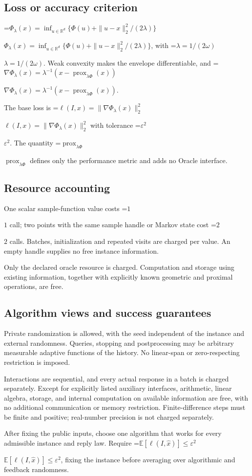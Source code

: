 \documentclass[10pt,a4paper]{article}
\newcommand{\AtlasMath}[1]{\par\begingroup\centering\setbox0=\hbox{$\displaystyle #1$}\ifdim\wd0>1.4\linewidth\typeout{ATLAS WIDE FORMULA: \the\wd0}\fi\ifdim\wd0>\linewidth\resizebox{\linewidth}{!}{\box0}\else\box0\fi\par\endgroup}
\newcommand{\AtlasInlineMath}[1]{\begingroup\setbox0=\hbox{$#1$}\ifdim\wd0>.4\linewidth\endgroup\AtlasMath{#1}\else\endgroup$#1$\fi}
\begin{document}
\subsection{Loss or accuracy criterion}
\AtlasInlineMath{\Phi_\lambda(x)=\inf_{u\in\mathbb{R}^d}\{\Phi(u)+\|u-x\|_2^2/(2\lambda)\}}, with \AtlasInlineMath{\lambda=1/(2\omega)}. Weak convexity makes the envelope differentiable, and \AtlasInlineMath{\nabla\Phi_\lambda(x)=\lambda^{-1}(x-\operatorname{prox}_{\lambda\Phi}(x))}.

The base loss is \AtlasInlineMath{\ell(I,x)=\|\nabla\Phi_\lambda(x)\|_2^2} with tolerance \AtlasInlineMath{\varepsilon^2}. The quantity \AtlasInlineMath{\operatorname{prox}_{\lambda\Phi}} defines only the performance metric and adds no Oracle interface.

\subsection{Resource accounting}
One scalar sample-function value costs \AtlasInlineMath{1} call; two points with the same sample handle or Markov state cost \AtlasInlineMath{2} calls. Batches, initialization and repeated visits are charged per value. An empty handle supplies no free instance information.

Only the declared oracle resource is charged. Computation and storage using existing information, together with explicitly known geometric and proximal operations, are free.

\subsection{Algorithm views and success guarantees}
Private randomization is allowed, with the seed independent of the instance and external randomness. Queries, stopping and postprocessing may be arbitrary measurable adaptive functions of the history. No linear-span or zero-respecting restriction is imposed.

Interactions are sequential, and every actual response in a batch is charged separately. Except for explicitly listed auxiliary interfaces, arithmetic, linear algebra, storage, and internal computation on available information are free, with no additional communication or memory restriction. Finite-difference steps must be finite and positive; real-number precision is not charged separately.

After fixing the public inputs, choose one algorithm that works for every admissible instance and reply law. Require \AtlasInlineMath{\mathbb{E}[\ell(I,\widehat{x})]\le \varepsilon^2}, fixing the instance before averaging over algorithmic and feedback randomness.
\end{document}
